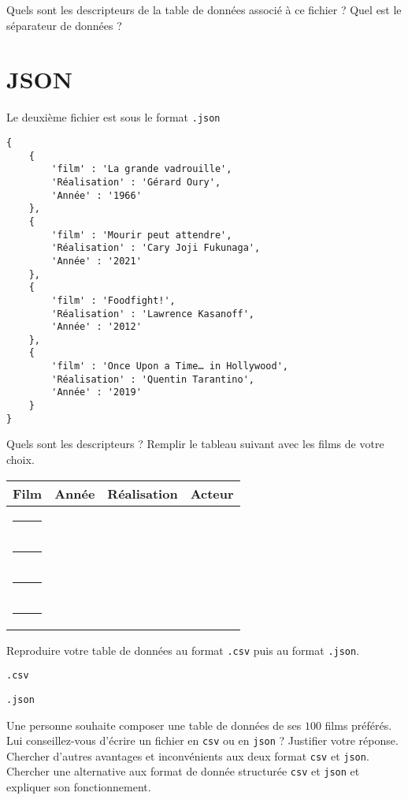 \documentclass{exam}
\begin{document}
\begin{questions}
\question Quels sont les descripteurs de la table de données associé à ce fichier ?
\question Quel est le séparateur de données ?

\section{JSON}

Le deuxième fichier est sous le format \verb|.json|

\begin{verbatim}
{
    {
        'film' : 'La grande vadrouille',
        'Réalisation' : 'Gérard Oury',
        'Année' : '1966'
    },
    {
        'film' : 'Mourir peut attendre',
        'Réalisation' : 'Cary Joji Fukunaga',
        'Année' : '2021'
    },
    {
        'film' : 'Foodfight!',
        'Réalisation' : 'Lawrence Kasanoff',
        'Année' : '2012'
    },
    {
        'film' : 'Once Upon a Time… in Hollywood',
        'Réalisation' : 'Quentin Tarantino',
        'Année' : '2019'
    }
}
\end{verbatim}
\question Quels sont les descripteurs ?
\newpage
\question Remplir le tableau suivant avec les films de votre choix.
\begin{center}
\begin{tabular}{|*{4}{C{4cm}|}}
\hline
Film & Année & Réalisation & Acteur\\
\hline
\rule[-0.5cm]{2cm}{0pt} &&&\\
\hline
\rule[-0.5cm]{2cm}{0pt} &&&\\
\hline
\rule[-0.5cm]{2cm}{0pt} &&&\\
\hline
\rule[-0.5cm]{2cm}{0pt} &&&\\
\hline
\end{tabular}
\end{center}
\question Reproduire votre table de données au format \verb|.csv| puis au format \verb|.json|.

\vspace*{0.5cm}
\begin{minipage}{0.5\textwidth}
\begin{center}
\verb|.csv|
\end{center}
\vspace*{5cm}    
\end{minipage}
\vline
\begin{minipage}{0.5\textwidth}
\begin{center}
\verb|.json|
\end{center}
\vspace*{5cm}
\end{minipage}
\question
Une personne souhaite composer une table de données de ses $100$ films préférés. Lui conseillez-vous d'écrire un fichier en \verb|csv| ou en \verb|json| ? Justifier votre réponse.
\vspace*{4cm}
\question Chercher d'autres avantages et inconvénients aux deux format \verb|csv| et \verb|json|.
\vspace*{4cm}
\question Chercher une alternative aux format de donnée structurée \verb|csv| et \verb|json| et expliquer son fonctionnement.
\end{questions}
\end{document}

